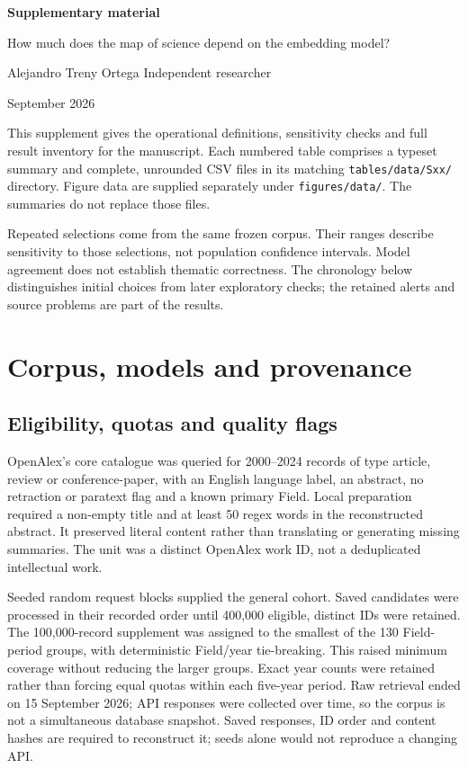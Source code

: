\documentclass[12pt]{article}
\begin{document}
\begin{center}
{\LARGE\bfseries Supplementary material\par}
\medskip
{\large How much does the map of science depend on the embedding model?\par}
\medskip
Alejandro Treny Ortega \textbullet{} Independent researcher\par
{} September 2026
\end{center}
This supplement gives the operational definitions, sensitivity checks and full result inventory for the manuscript. Each numbered table comprises a typeset summary and complete, unrounded CSV files in its matching \nolinkurl{tables/data/Sxx/} directory. Figure data are supplied separately under \nolinkurl{figures/data/}. The summaries do not replace those files.

Repeated selections come from the same frozen corpus. Their ranges describe sensitivity to those selections, not population confidence intervals. Model agreement does not establish thematic correctness. The chronology below distinguishes initial choices from later exploratory checks; the retained alerts and source problems are part of the results.
\medskip
{\small{}\setcounter{tocdepth}{1}\tableofcontents}
\clearpage

\section{Corpus, models and provenance}
\subsection{Eligibility, quotas and quality flags}
OpenAlex's core catalogue was queried for 2000--2024 records of type article, review or conference-paper, with an English language label, an abstract, no retraction or paratext flag and a known primary Field. Local preparation required a non-empty title and at least 50 regex words in the reconstructed abstract. It preserved literal content rather than translating or generating missing summaries. The unit was a distinct OpenAlex work ID, not a deduplicated intellectual work.

Seeded random request blocks supplied the general cohort. Saved candidates were processed in their recorded order until 400,000 eligible, distinct IDs were retained. The 100,000-record supplement was assigned to the smallest of the 130 Field-period groups, with deterministic Field/year tie-breaking. This raised minimum coverage without reducing the larger groups. Exact year counts were retained rather than forcing equal quotas within each five-year period. Raw retrieval ended on 15 September 2026; API responses were collected over time, so the corpus is not a simultaneous database snapshot. Saved responses, ID order and content hashes are required to reconstruct it; seeds alone would not reproduce a changing API.
\end{document}
